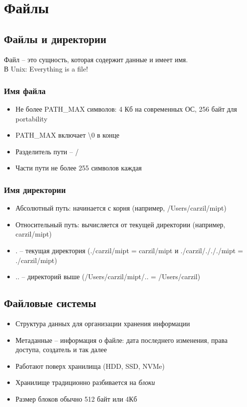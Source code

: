 \section{Файлы}
  \subsection{Файлы и директории}
    Файл -- это сущность, которая содержит данные и имеет имя.\\
    В Unix: Everything is a file!
  
  \subsubsection{Имя файла}
    \begin{itemize}
      \item Не более PATH\_MAX символов: 4 Кб на современных ОС, 256 байт для portability
      \item PATH\_MAX включает \textbackslash 0 в конце
      \item Разделитель пути -- /
      \item Части пути не более 255 символов каждая
    \end{itemize}
    
  \subsubsection{Имя директории}
    \begin{itemize}
      \item Абсолютный путь: начинается с корня (например, /Users/carzil/mipt)
      \item Относительный путь: вычисляется от текущей директории (например, carzil/mipt)
      \item . -- текущая директория (./carzil/mipt = carzil/mipt и ./carzil/./././mipt = ./carzil/mipt)
      \item .. -- директорий выше (/Users/carzil/mipt/.. = /Users/carzil)
    \end{itemize}
    
  \subsection{Файловые системы}
      \begin{itemize}
        \item Структура данных для организации хранения информации
        \item Метаданные -- информация о файле: дата последнего изменения, права доступа, создатель и так далее
        \item Работают поверх хранилища (HDD, SSD, NVMe)
        \item Хранилище традиционно разбивается на \textit{блоки}
        \item Размер блоков обычно 512 байт или 4Кб
      \end{itemize}
  
